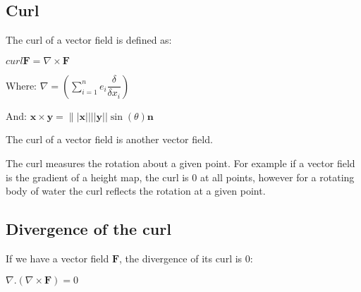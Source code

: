 
\subsection{Curl}

The curl of a vector field is defined as:

\(curl \mathbf F=\nabla \times \mathbf F\)

Where: \(\nabla =(\sum_{i=1}^n e_i\dfrac{\delta }{\delta x_i})\)

And: \(\mathbf x\times \mathbf y=\||\mathbf x|| ||\mathbf y|| \sin(\theta )\mathbf n\)

The curl of a vector field is another vector field.

The curl measures the rotation about a given point. For example if a vector field is the gradient of a height map, the curl is \(0\) at all points, however for a rotating body of water the curl reflects the rotation at a given point.

\subsection{Divergence of the curl}

If we have a vector field \(\mathbf F\), the divergence of its curl is \(0\):

\(\nabla . (\nabla \times \mathbf F)=0\)

